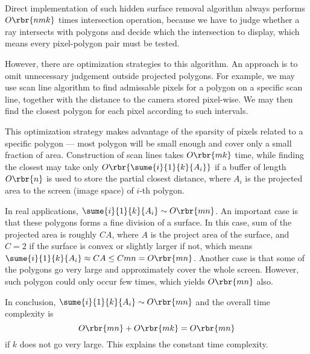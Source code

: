 \documentclass[english, nochinese, nobib]{pkupaper}
\title{\titlemark}
\author{\authoring}
\begin{document}
\maketitle

\begin{thmquestion}
\ 
\begin{thmanswer}
Direct implementation of such hidden surface removal algorithm always performs $ O \rbr{ n m k } $ times intersection operation, because we have to judge whether a ray intersects with polygons and decide which the intersection to display, which means every pixel-polygon pair must be tested.

However, there are optimization strategies to this algorithm. An approach is to omit unnecessary judgement outside projected polygons. For example, we may use scan line algorithm to find admissable pixels for a polygon on a specific scan line, together with the distance to the camera stored pixel-wise. We may then find the closest polygon for each pixel according to such intervals.

This optimization strategy makes advantage of the sparsity of pixels related to a specific polygon --- most polygon will be small enough and cover only a small fraction of area. Construction of scan lines takes $ O \rbr{ m k } $ time, while finding the closest may take only $ O \rbr{\sume{i}{1}{k}{A_i}} $ if a buffer of length $ O \rbr{n} $ is used to store the partial closest distance, where $A_i$ is the projected area to the screen (image space) of $i$-th polygon.

In real applications, $ \sume{i}{1}{k}{A_i} \sim O \rbr{ m n } $. An important case is that these polygons forms a fine division of a surface. In this case, sum of the projected area is roughly $ C A $, where $A$ is the project area of the surface, and $ C = 2 $ if the surface is convex or slightly larger if not, which means $ \sume{i}{1}{k}{A_i} \approx C A \le C m n = O \rbr{ m n } $. Another case is that some of the polygons go very large and approximately cover the whole screen. However, such polygon could only occur few times, which yields $ O \rbr{ m n } $ also.

In conclusion, $ \sume{i}{1}{k}{A_i} \sim O \rbr{ m n } $ and the overall time complexity is
\begin{equation}
O \rbr{ m n } + O \rbr{ m k } = O \rbr{ m n }
\end{equation}
if $k$ does not go very large. This explains the constant time complexity.
\end{thmanswer}
\end{thmquestion}
\end{document}
